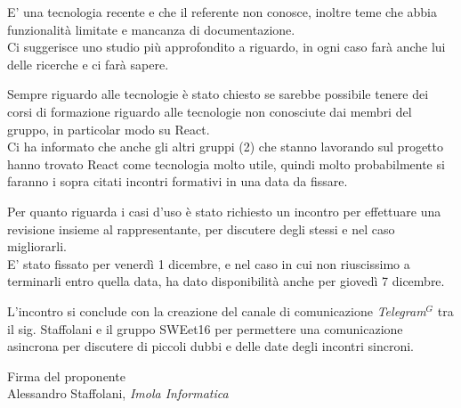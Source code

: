 \documentclass[a4paper, 11pt]{article}
\begin{document}
E' una tecnologia recente e che il referente non conosce, inoltre teme che abbia funzionalità limitate e mancanza di documentazione. \\
Ci suggerisce uno studio più approfondito a riguardo, in ogni caso farà anche lui delle ricerche e ci farà sapere.

Sempre riguardo alle tecnologie è stato chiesto se sarebbe possibile tenere dei corsi di formazione riguardo alle tecnologie non conosciute dai membri del gruppo, in particolar modo su React. \\
Ci ha informato che anche gli altri gruppi (2) che stanno lavorando sul progetto hanno trovato React come tecnologia molto utile,
 quindi molto probabilmente si faranno i sopra citati incontri formativi in una data da fissare.

Per quanto riguarda i casi d'uso è stato richiesto un incontro per effettuare una revisione insieme al rappresentante, per discutere degli stessi e nel caso migliorarli. \\
E' stato fissato per venerdì 1 dicembre, e nel caso in cui non riuscissimo a terminarli entro quella data, ha dato disponibilità anche per giovedì 7 dicembre.

L'incontro si conclude con la creazione del canale di comunicazione \emph{Telegram}$^{G}$ tra il sig. Staffolani
e il gruppo SWEet16 per permettere una comunicazione asincrona per discutere di piccoli dubbi e delle date degli incontri sincroni.

\vspace{100pt}
\begin{flushleft}
\hfill Firma del proponente \\
\vspace{50pt}
\hfill Alessandro Staffolani, \textit{Imola Informatica}
\end{flushleft}
\end{document}
